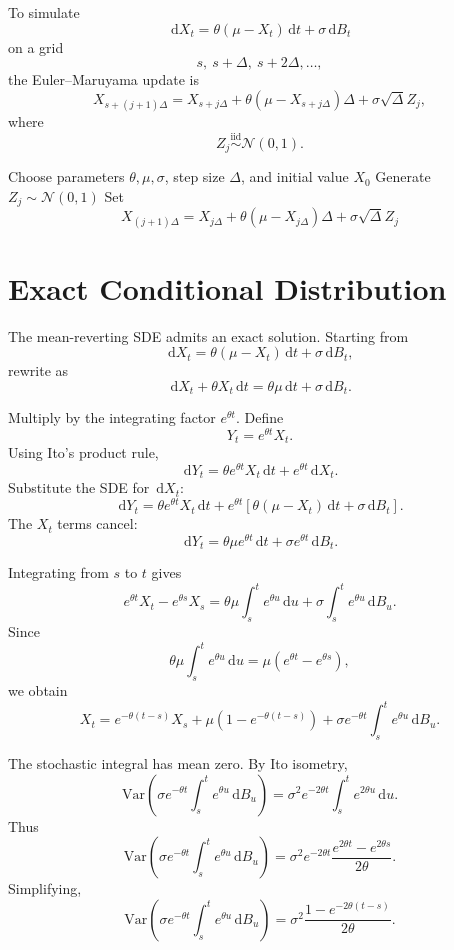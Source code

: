 \documentclass[12pt,oneside]{book}
\numberwithin{equation}{section}
\theoremstyle{definition}
\theoremstyle{plain}
\theoremstyle{remark}
\newcommand{\Var}{\mathrm{Var}}
\newcommand{\iid}{\overset{\text{iid}}{\sim}}
\newcommand{\dd}{\,\mathrm{d}}
\newcommand{\Normal}{\mathcal{N}}
\begin{document}
To simulate
\[
\dd X_t=\theta(\mu-X_t)\dd t+\sigma\dd B_t
\]
on a grid
\[
s,\ s+\Delta,\ s+2\Delta,\ldots,
\]
the Euler--Maruyama update is
\[
X_{s+(j+1)\Delta}
=
X_{s+j\Delta}
+
\theta(\mu-X_{s+j\Delta})\Delta
+
\sigma\sqrt{\Delta}Z_j,
\]
where
\[
Z_j\iid \Normal(0,1).
\]

\begin{algorithm}[H]
\caption{Euler--Maruyama Simulation of a Mean-Reverting Process}
\begin{algorithmic}[1]
\State Choose parameters $\theta,\mu,\sigma$, step size $\Delta$, and initial value $X_0$
    \State Generate $Z_j\sim \Normal(0,1)$
    \State Set
    \[
    X_{(j+1)\Delta}
    =
    X_{j\Delta}
    +
    \theta(\mu-X_{j\Delta})\Delta
    +
    \sigma\sqrt{\Delta}Z_j
    \]
\EndFor
\end{algorithmic}
\end{algorithm}

\section{Exact Conditional Distribution}

The mean-reverting SDE admits an exact solution. Starting from
\[
\dd X_t=\theta(\mu-X_t)\dd t+\sigma\dd B_t,
\]
rewrite as
\[
\dd X_t+\theta X_t\dd t=\theta\mu\dd t+\sigma\dd B_t.
\]

Multiply by the integrating factor $e^{\theta t}$. Define
\[
Y_t=e^{\theta t}X_t.
\]
Using Ito's product rule,
\[
\dd Y_t
=
\theta e^{\theta t}X_t\dd t+e^{\theta t}\dd X_t.
\]
Substitute the SDE for $\dd X_t$:
\[
\dd Y_t
=
\theta e^{\theta t}X_t\dd t
+
e^{\theta t}\left[\theta(\mu-X_t)\dd t+\sigma\dd B_t\right].
\]
The $X_t$ terms cancel:
\[
\dd Y_t
=
\theta\mu e^{\theta t}\dd t
+
\sigma e^{\theta t}\dd B_t.
\]

Integrating from $s$ to $t$ gives
\[
e^{\theta t}X_t-e^{\theta s}X_s
=
\theta\mu\int_s^t e^{\theta u}\dd u
+
\sigma\int_s^t e^{\theta u}\dd B_u.
\]
Since
\[
\theta\mu\int_s^t e^{\theta u}\dd u
=
\mu(e^{\theta t}-e^{\theta s}),
\]
we obtain
\[
X_t
=
e^{-\theta(t-s)}X_s
+
\mu(1-e^{-\theta(t-s)})
+
\sigma e^{-\theta t}\int_s^t e^{\theta u}\dd B_u.
\]

The stochastic integral has mean zero. By Ito isometry,
\[
\Var\left(
\sigma e^{-\theta t}\int_s^t e^{\theta u}\dd B_u
\right)
=
\sigma^2 e^{-2\theta t}
\int_s^t e^{2\theta u}\dd u.
\]
Thus
\[
\Var\left(
\sigma e^{-\theta t}\int_s^t e^{\theta u}\dd B_u
\right)
=
\sigma^2 e^{-2\theta t}
\frac{e^{2\theta t}-e^{2\theta s}}{2\theta}.
\]
Simplifying,
\[
\Var\left(
\sigma e^{-\theta t}\int_s^t e^{\theta u}\dd B_u
\right)
=
\sigma^2
\frac{1-e^{-2\theta(t-s)}}{2\theta}.
\]
\end{document}
